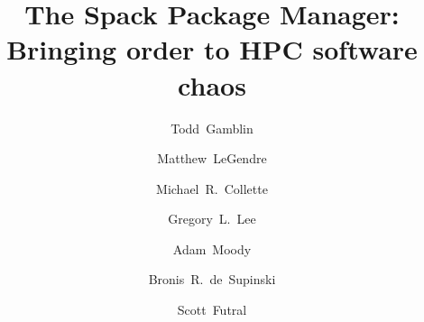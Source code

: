 \documentclass{sig-alternate}
\begin{document}
\title{The Spack Package Manager:\\
Bringing order to HPC software chaos}
\author{
\alignauthor Todd~Gamblin\\
\and
\alignauthor Matthew~LeGendre\\
\and
\alignauthor Michael~R.~Collette\\
\and
\alignauthor Gregory~L.~Lee\\
\and
\alignauthor Adam~Moody\\
\and
\alignauthor Bronis~R.~de~Supinski\\
\and
\alignauthor Scott~Futral\\
\and
{}
}

\begingroup
{}
\maketitle
\par\endgroup
\begin{abstract}
	
\end{abstract}


\newpage









\end{document}

